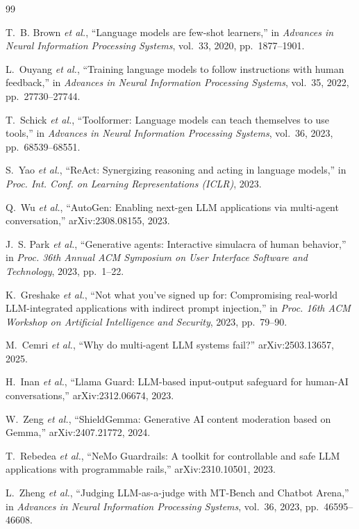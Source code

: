 \documentclass[journal,onecolumn,12pt]{IEEEtran}
\begin{document}
\begin{thebibliography}{99}



 T.~B. Brown \emph{et al.}, ``Language models are few-shot learners,'' in \emph{Advances in Neural Information Processing Systems}, vol.~33, 2020, pp.~1877--1901.

 L.~Ouyang \emph{et al.}, ``Training language models to follow instructions with human feedback,'' in \emph{Advances in Neural Information Processing Systems}, vol.~35, 2022, pp.~27730--27744.

 T.~Schick \emph{et al.}, ``Toolformer: Language models can teach themselves to use tools,'' in \emph{Advances in Neural Information Processing Systems}, vol.~36, 2023, pp.~68539--68551.

 S.~Yao \emph{et al.}, ``ReAct: Synergizing reasoning and acting in language models,'' in \emph{Proc. Int. Conf. on Learning Representations (ICLR)}, 2023.

 Q.~Wu \emph{et al.}, ``AutoGen: Enabling next-gen LLM applications via multi-agent conversation,'' arXiv:2308.08155, 2023.

 J.~S. Park \emph{et al.}, ``Generative agents: Interactive simulacra of human behavior,'' in \emph{Proc. 36th Annual ACM Symposium on User Interface Software and Technology}, 2023, pp.~1--22.

 K.~Greshake \emph{et al.}, ``Not what you've signed up for: Compromising real-world LLM-integrated applications with indirect prompt injection,'' in \emph{Proc. 16th ACM Workshop on Artificial Intelligence and Security}, 2023, pp.~79--90.

 M.~Cemri \emph{et al.}, ``Why do multi-agent LLM systems fail?'' arXiv:2503.13657, 2025.

 H.~Inan \emph{et al.}, ``Llama Guard: LLM-based input-output safeguard for human-AI conversations,'' arXiv:2312.06674, 2023.

 W.~Zeng \emph{et al.}, ``ShieldGemma: Generative AI content moderation based on Gemma,'' arXiv:2407.21772, 2024.

 T.~Rebedea \emph{et al.}, ``NeMo Guardrails: A toolkit for controllable and safe LLM applications with programmable rails,'' arXiv:2310.10501, 2023.

 L.~Zheng \emph{et al.}, ``Judging LLM-as-a-judge with MT-Bench and Chatbot Arena,'' in \emph{Advances in Neural Information Processing Systems}, vol.~36, 2023, pp.~46595--46608.


\end{thebibliography}
\end{document}
